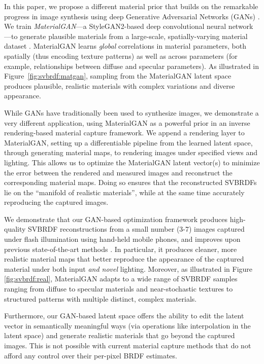 In this paper, we propose a different material prior that builds on the remarkable progress in image synthesis using deep Generative Adversarial Networks (GANs) \cite{Goodfellow2014,Karras2018,StyleGAN}.
We train \emph{MaterialGAN}---a StyleGAN2-based deep convolutional neural network \cite{StyleGAN2}---to generate plausible materials from a large-scale, spatially-varying material dataset \cite{Deschaintre2018}.
MaterialGAN learns \emph{global} correlations in material parameters, both spatially (thus encoding texture patterns) as well as across parameters (for example, relationships between diffuse and specular parameters).
As illustrated in Figure~\ref{fig:svbrdf:matgan}, sampling from the MaterialGAN latent space produces plausible, realistic materials with complex variations and diverse appearance.



While GANs have traditionally been used to synthesize images, we demonstrate a very different application, using MaterialGAN as a powerful prior in an inverse rendering-based material capture framework.
We append a rendering layer to MaterialGAN, setting up a differentiable pipeline from the learned latent space, through generating material maps, to rendering images under specified views and lighting.
This allows us to optimize the MaterialGAN latent vector(s) to minimize the error between the rendered and measured images and reconstruct the corresponding material maps.
Doing so ensures that the reconstructed SVBRDFs lie on the ``manifold of realistic materials'', while at the same time accurately reproducing the captured images.

We demonstrate that our GAN-based optimization framework produces high-quality SVBRDF reconstructions from a small number (3-7) images captured under flash illumination using hand-held mobile phones, and improves upon previous state-of-the-art methods \cite{Gao2019,Deschaintre2019}.
In particular, it produces cleaner, more realistic material maps that better reproduce the appearance of the captured material under both input \emph{and novel} lighting.
Moreover, as illustrated in Figure \ref{fig:svbrdf:real}, MaterialGAN adapts to a wide range of SVBRDF samples ranging from diffuse to specular materials and near-stochastic textures to structured patterns with multiple distinct, complex materials.

Furthermore, our GAN-based latent space offers the ability to edit the latent vector in semantically meaningful ways (via operations like interpolation in the latent space) and generate realistic materials that go beyond the captured images.
This is not possible with current material capture methods that do not afford any control over their per-pixel BRDF estimates.

